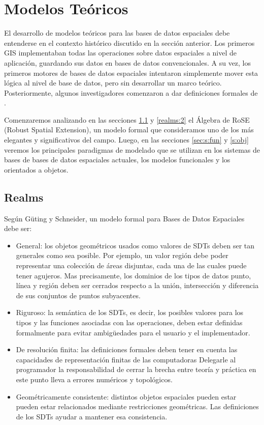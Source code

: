 \section{Modelos Teóricos} \label{sec:s:models}

El desarrollo de modelos teóricos para las bases de datos espaciales debe entenderse en el contexto histórico discutido en la sección anterior.
Los primeros GIS implementaban todas las operaciones sobre datos espaciales a nivel de aplicación, guardando sus datos en bases de datos convencionales.
A su vez, los primeros motores de bases de datos espaciales intentaron simplemente mover esta lógica al nivel de base de datos, pero sin desarrollar un marco teórico.
Posteriormente, algunos investigadores comenzaron a dar definiciones formales de .

Comenzaremos analizando en las secciones \ref{realms:1} y \ref{realms:2} el Álgebra de RoSE\textsuperscript{\cite{rose}} (Robust Spatial Extension), un modelo formal que consideramos uno de los más elegantes y significativos del campo.
Luego, en las secciones \ref{sec:s:fun} y \ref{s:obj} veremos los principales paradigmas de modelado que se utilizan en los sistemas de bases de bases de datos espaciales actuales, los modelos funcionales y los orientados a objetos.

\subsection{Realms} \label{realms:1}

Según Güting y Schneider\textsuperscript{\cite{rose}}, un modelo formal para Bases de Datos Espaciales debe ser:
\begin{itemize}
    \item General: los objetos geométricos usados como valores de SDTs deben ser tan generales como sea posible.
        Por ejemplo, un valor región debe poder representar una colección de áreas disjuntas, cada una de las cuales puede tener agujeros.
        Mas precisamente, los dominios de los tipos de datos punto, línea y región deben ser cerrados respecto a la unión,
        intersección y diferencia de sus conjuntos de puntos subyacentes.
    \item Riguroso: la semántica de los SDTs, es decir, los posibles valores para los tipos y las funciones asociadas con las operaciones,
        deben estar definidas formalmente para evitar ambigüedades para el usuario y el implementador.
    \item De resolución finita: las definiciones formales deben tener en cuenta las capacidades de representación finitas de las computadoras
        Delegarle al programador la responsabilidad de cerrar la brecha entre teoría y práctica en este punto lleva a errores numéricos y topológicos.
    \item Geométricamente consistente: distintos objetos espaciales pueden estar pueden estar relacionados mediante restricciones geométricas.
        Las definiciones de los SDTs ayudar a mantener esa consistencia.
\end{itemize}

